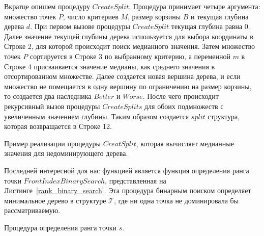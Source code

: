 Вкратце опишем процедуру $CreateSplit$. Процедура принимает четыре аргумента: множество точек $P$, число критериев $M$, размер корзины $B$ и текущая глубина дерева $d$. При первом вызове процедуры $CreateSplit$ текущая глубина равна $0$. Далее значение текущей глубины дерева используется для выбора координаты в Строке 2, для которой происходит поиск медианного значения. Затем множество точек $P$ сортируется в Строке 3 по выбранному критерию, а переменной $m$ в Строке 4 присваивается значение медианы, как среднего значения в отсортированном множестве. Далее создается новая вершина дерева, и если множество не помещается в одну вершину по ограничению на размер корзины, то создается два наследника $Better$ и $Worse$. После чего происходит рекурсивный вызов процедуры $CreateSplits$ для обоих подмножеств с увеличенным значением глубины. Таким образом создается $split$ структура, которая возвращается в Строке 12. 

\begin{algorithm}
\begin{algorithmic}[1]
    \EndIf
\EndProcedure
\end{algorithmic}
\caption{Пример реализации процедуры $CreatSplit$, которая вычисляет медианные значения для недоминирующего дерева.}
\label{create_split}
\end{algorithm}

Последней интересной для нас функцией является функция определения ранга точки $FrontIndexBinarySearch$, представленная на Листинге~\ref{rank_binary_search}. Эта процедура бинарным поиском определяет минимальное дерево в структуре $\mathcal{T}$, где ни одна точка не доминировала бы рассматриваемую. 

\begin{algorithm}
\begin{algorithmic}[1]
        \Else
        \EndIf    
    \EndWhile
\EndProcedure
\end{algorithmic}
\caption{Процедура определения ранга точки $s$.}
\label{rank_binary_search}
\end{algorithm}

